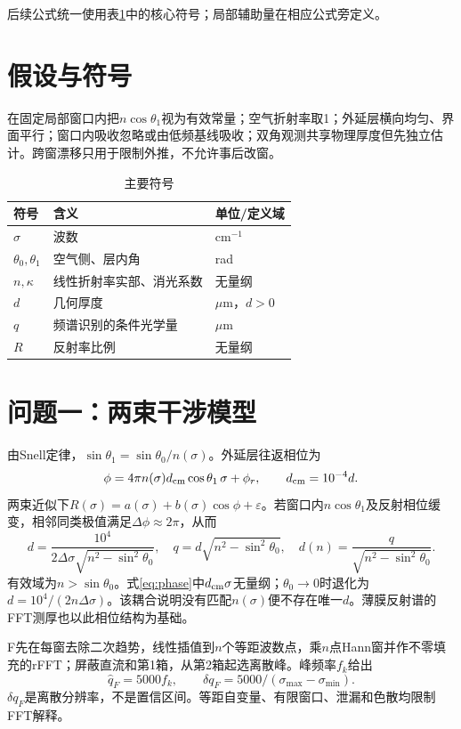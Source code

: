 \documentclass[UTF8,12pt,a4paper]{ctexart}
\begin{document}
后续公式统一使用表\ref{tab:symbols}中的核心符号；局部辅助量在相应公式旁定义。

\section{假设与符号}
在固定局部窗口内把$n\cos\theta_1$视为有效常量；空气折射率取1；外延层横向均匀、界面平行；窗口内吸收忽略或由低频基线吸收；双角观测共享物理厚度但先独立估计。跨窗漂移只用于限制外推，不允许事后改窗。

\begin{table}[H]\centering\small\caption{主要符号}\label{tab:symbols}
\begin{tabular}{lll}\toprule 符号&含义&单位/定义域\\\midrule
$\sigma$&波数&cm$^{-1}$\\ $\theta_0,\theta_1$&空气侧、层内角&rad\\
$n,\kappa$&线性折射率实部、消光系数&无量纲\\ $d$&几何厚度&$\mu$m，$d>0$\\
$q$&频谱识别的条件光学量&$\mu$m\\ $R$&反射率比例&无量纲\\\bottomrule
\end{tabular}\end{table}

\section{问题一：两束干涉模型}
由Snell定律，$\sin\theta_1=\sin\theta_0/n(\sigma)$。外延层往返相位为
\begin{equation}\phi=4\pi n(\sigma)d_{\rm cm}\cos\theta_1\,\sigma+\phi_r,\qquad d_{\rm cm}=10^{-4}d.\label{eq:phase}\end{equation}
两束近似下$R(\sigma)=a(\sigma)+b(\sigma)\cos\phi+\varepsilon$。若窗口内$n\cos\theta_1$及反射相位缓变，相邻同类极值满足$\Delta\phi\approx2\pi$，从而
\begin{equation}d=\frac{10^4}{2\Delta\sigma\sqrt{n^2-\sin^2\theta_0}},\quad
q=d\sqrt{n^2-\sin^2\theta_0},\quad d(n)=\frac{q}{\sqrt{n^2-\sin^2\theta_0}}.\label{eq:dn}\end{equation}
有效域为$n>\sin\theta_0$。式\eqref{eq:phase}中$d_{\rm cm}\sigma$无量纲；$\theta_0\to0$时退化为$d=10^4/(2n\Delta\sigma)$。该耦合说明没有匹配$n(\sigma)$便不存在唯一$d$。薄膜反射谱的FFT测厚也以此相位结构为基础\cite{Quinten2019FFTThickness}。

F先在每窗去除二次趋势，线性插值到$n$个等距波数点，乘$n$点Hann窗并作不零填充的rFFT；屏蔽直流和第1箱，从第2箱起选离散峰。峰频率$f_k$给出
\begin{equation}\widehat q_F=5000f_k,\qquad \delta q_F=5000/(\sigma_{\max}-\sigma_{\min}).\label{eq:fft}\end{equation}
$\delta q_F$是离散分辨率，不是置信区间。等距自变量、有限窗口、泄漏和色散均限制FFT解释\cite{Quinten2019FFTThickness}。
\end{document}

